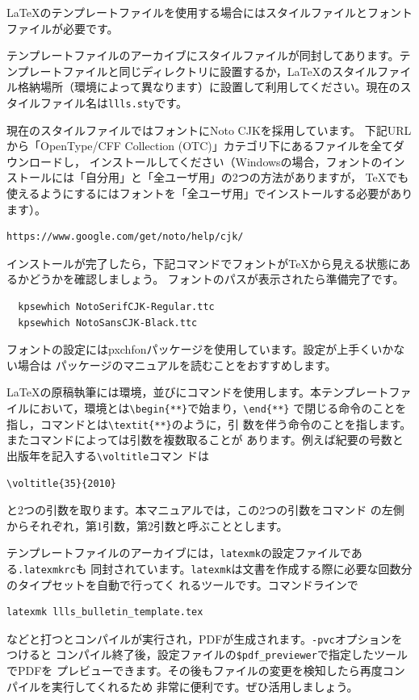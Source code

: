 \documentclass[b5paper,10pt,twocolumn,tombow]{jarticle}
\begin{document}
\LaTeX{}のテンプレートファイルを使用する場合にはスタイルファイルとフォントファイルが必要です。

テンプレートファイルのアーカイブにスタイルファイルが同封してあります。テ
ンプレートファイルと同じディレクトリに設置するか，\LaTeX{}のスタイルファイ
ル格納場所（環境によって異なります）に設置して利用してください。現在のス
タイルファイル名は\texttt{llls.sty}です。

現在のスタイルファイルではフォントにNoto CJKを採用しています。
下記URLから「OpenType/CFF Collection (OTC)」カテゴリ下にあるファイルを全てダウンロードし，
インストールしてください（Windowsの場合，フォントのインストールには「自分用」と「全ユーザ用」の2つの方法がありますが，
TeXでも使えるようにするにはフォントを「全ユーザ用」でインストールする必要があります）。

\begin{verbatim}
https://www.google.com/get/noto/help/cjk/
\end{verbatim}

インストールが完了したら，下記コマンドでフォントがTeXから見える状態にあるかどうかを確認しましょう。
フォントのパスが表示されたら準備完了です。

\begin{verbatim}
  kpsewhich NotoSerifCJK-Regular.ttc
  kpsewhich NotoSansCJK-Black.ttc
\end{verbatim}

フォントの設定にはpxchfonパッケージを使用しています。設定が上手くいかない場合は
パッケージのマニュアルを読むことをおすすめします。

\LaTeX{}の原稿執筆には環境，並びにコマンドを使用します。本テンプレートファ
イルにおいて，環境とは\verb|\begin{**}|で始まり，\verb|\end{**}|
で閉じる命令のことを指し，コマンドとは\verb|\textit{**}|のように，引
数を伴う命令のことを指します。またコマンドによっては引数を複数取ることが
あります。例えば紀要の号数と出版年を記入する\verb|\voltitle|コマン
ドは
\begin{verbatim}
\voltitle{35}{2010}
\end{verbatim}
と2つの引数を取ります。本マニュアルでは，この2つの引数をコマンド
の左側からそれぞれ，第1引数，第2引数と呼ぶこととします。

テンプレートファイルのアーカイブには，\texttt{latexmk}の設定ファイルである\texttt{.latexmkrc}も
同封されています。\texttt{latexmk}は文書を作成する際に必要な回数分のタイプセットを自動で行ってく
れるツールです。コマンドラインで
\begin{verbatim}
latexmk llls_bulletin_template.tex
\end{verbatim}
などと打つとコンパイルが実行され，PDFが生成されます。\verb|-pvc|オプションをつけると
コンパイル終了後，設定ファイルの\verb|$pdf_previewer|で指定したツールでPDFを
プレビューできます。その後もファイルの変更を検知したら再度コンパイルを実行してくれるため
非常に便利です。ぜひ活用しましょう。
\end{document}
